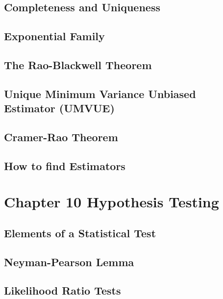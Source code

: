\documentclass[a4paper,12pt]{article}
\theoremstyle{nonitalic}
\begin{document}
    \newpage

    \subsection{Completeness and Uniqueness}

    \newpage

    \subsection{Exponential Family}

    \newpage

    \subsection{The Rao-Blackwell Theorem}

    \newpage

    \subsection{Unique Minimum Variance Unbiased Estimator (UMVUE)}

    \newpage

    \subsection{Cramer-Rao Theorem}

    \newpage

    \subsection{How to find Estimators}

    \newpage

    \section{Chapter 10 \textemdash{} Hypothesis Testing}

    \subsection{Elements of a Statistical Test}

    \newpage

    \subsection{Neyman-Pearson Lemma}

    \newpage

    \subsection{Likelihood Ratio Tests}
\end{document}
